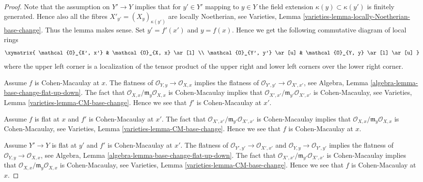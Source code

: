 \begin{proof}
Note that the assumption on $Y' \to Y$ implies that for $y' \in Y'$
mapping to $y \in Y$ the field extension $\kappa(y) \subset \kappa(y')$
is finitely generated. Hence also all the fibres
$X'_{y'} = (X_y)_{\kappa(y')}$ are locally Noetherian, see
Varieties, Lemma \ref{varieties-lemma-locally-Noetherian-base-change}.
Thus the lemma makes sense. Set $y' = f'(x')$ and $y = f(x)$.
Hence we get the following commutative diagram of local rings
$$
\xymatrix{
\mathcal{O}_{X', x'} & \mathcal{O}_{X, x} \ar[l] \\
\mathcal{O}_{Y', y'} \ar[u] & \mathcal{O}_{Y, y} \ar[l] \ar[u]
}
$$
where the upper left corner is a localization of the tensor product
of the upper right and lower left corners over the lower right corner.

\medskip\noindent
Assume $f$ is Cohen-Macaulay at $x$.
The flatness of $\mathcal{O}_{Y, y} \to \mathcal{O}_{X, x}$
implies the flatness of $\mathcal{O}_{Y', y'} \to \mathcal{O}_{X', x'}$, see
Algebra, Lemma \ref{algebra-lemma-base-change-flat-up-down}.
The fact that $\mathcal{O}_{X, x}/\mathfrak m_y\mathcal{O}_{X, x}$
is Cohen-Macaulay implies that
$\mathcal{O}_{X', x'}/\mathfrak m_{y'}\mathcal{O}_{X', x'}$
is Cohen-Macaulay, see
Varieties, Lemma \ref{varieties-lemma-CM-base-change}. Hence we see that $f'$
is Cohen-Macaulay at $x'$.

\medskip\noindent
Assume $f$ is flat at $x$ and $f'$ is Cohen-Macaulay at $x'$.
The fact that $\mathcal{O}_{X', x'}/\mathfrak m_{y'}\mathcal{O}_{X', x'}$
is Cohen-Macaulay implies that
$\mathcal{O}_{X, x}/\mathfrak m_y\mathcal{O}_{X, x}$
is Cohen-Macaulay, see
Varieties, Lemma \ref{varieties-lemma-CM-base-change}.
Hence we see that $f$ is Cohen-Macaulay at $x$.

\medskip\noindent
Assume $Y' \to Y$ is flat at $y'$ and $f'$ is Cohen-Macaulay at
$x'$. The flatness of $\mathcal{O}_{Y', y'} \to \mathcal{O}_{X', x'}$
and $\mathcal{O}_{Y, y} \to \mathcal{O}_{Y', y'}$ implies the flatness
of $\mathcal{O}_{Y, y} \to \mathcal{O}_{X, x}$, see
Algebra, Lemma \ref{algebra-lemma-base-change-flat-up-down}.
The fact that $\mathcal{O}_{X', x'}/\mathfrak m_{y'}\mathcal{O}_{X', x'}$
is Cohen-Macaulay implies that
$\mathcal{O}_{X, x}/\mathfrak m_y\mathcal{O}_{X, x}$
is Cohen-Macaulay, see
Varieties, Lemma \ref{varieties-lemma-CM-base-change}. Hence we see that $f$
is Cohen-Macaulay at $x$.
\end{proof}

